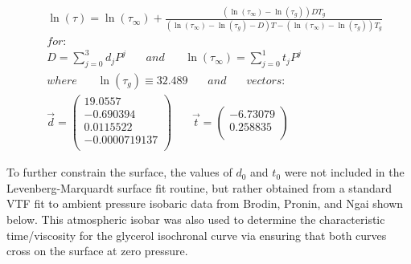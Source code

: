 \begin{equation}
	\begin{split}
		\:&\ln(\tau)=\ln(\tau_{\infty})+\frac{\left (\ln(\tau_{\infty})-\ln(\tau_g)  \right )DT_g}{\left (  \ln(\tau_{\infty})-\ln(\tau_g)-D\right )T-\left (\ln(\tau_{\infty})-\ln(\tau_g)  \right )T_g}\\
		&for:\\
		&D=\sum_{j=0}^{3}d_{j}P^{j}\:\:\:\:\:\:\:\:and\:\:\:\:\:\:\:\:\ln(\tau_{\infty})=\sum_{j=0}^{1}t_{j}P^{j}\\
		& where\:\:\:\:\:\:\:\:\ln(\tau_g)\equiv 32.489 \:\:\:\:\:\:\:\:and\:\:\:\:\:\:\:\:vectors:\\	&\vec{d}=\begin{pmatrix}
			19.0557\\ 
			-0.690394\\ 
			0.0115522\\ 
			-0.0000719137\\ 
		\end{pmatrix} \:\:\:\:\:\:\:\:
		\vec{t}=\begin{pmatrix}
			-6.73079\\ 
			0.258835\\ 
		\end{pmatrix}
	\end{split}
	\label{eqn:glycerolSurfaceModel}
\end{equation}

To further constrain the surface, the values of $d_0$ and $t_0$ were not included in the Levenberg-Marquardt surface fit routine, but rather obtained from a standard VTF fit to ambient pressure isobaric data from Brodin, Pronin, and Ngai shown below\cite{Pronin,Brodin,Ngai}.  This atmospheric isobar was also used to determine the characteristic time/viscosity for the glycerol \tgp isochronal curve via ensuring that both curves cross on the surface at zero pressure.

